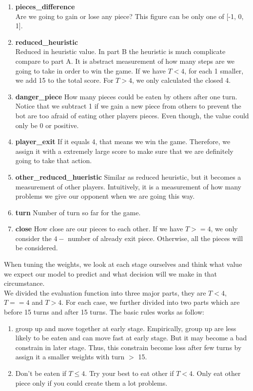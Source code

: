 \documentclass[11pt]{article}
\begin{document}
\begin{enumerate}
  \item \textbf{pieces\_difference} \\
        Are we going to gain or lose any piece? This figure can be only one of [-1, 0, 1].
  \item \textbf{reduced\_heuristic} \\
        Reduced in heuristic value. In part B the heuristic is much complicate compare to part A. It is
        abstract measurement of how many steps are we going to take in order to win the game. If we have 
        $T < 4$, for each 1 smaller, we add 15 to the total score. For $T > 4$, we only calculated the
        closed 4.
  \item \textbf{danger\_piece}
        How many pieces could be eaten by others after one turn. Notice that we subtract 1 if we gain a 
        new piece from others to prevent the bot are too afraid of eating other players pieces. 
        Even though, the value could only be 0 or positive.
  \item \textbf{player\_exit}
        If it equals 4, that means we win the game. Therefore, we assign it with a extremely large score to make sure
        that we are definitely going to take that action.
  \item \textbf{other\_reduced\_hueristic}
        Similar as reduced heuristic, but it becomes a measurement of other players. Intuitively, it is a measurement of
        how many problems we give our opponent when we are going this way.
  \item \textbf{turn}
        Number of turn so far for the game.
  \item \textbf{close}
        How close are our pieces to each other. If we have $T >= 4$, we only consider the $4 - $ number of 
        already exit piece. Otherwise, all the pieces will be considered.
\end{enumerate}

When tuning the weights, we look at each stage ourselves and think what value we expect our model 
to predict and what decision will we make in that circumstance.
\\
We divided the evaluation function into three major parts, they are $T<4$, $T==4$ and $T>4$. For each case, we further
divided into two parts which are before 15 turns and after 15 turns. The basic rules works as follow:

\begin{enumerate}
  \item group up and move together at early stage. Empirically, group up are less likely to be eaten and can move fast
        at early stage. But it may become a bad constrain in later stage. Thus, this constrain become loss 
        after few turns by assign it a smaller weights with turn $>$ 15.
  \item Don't be eaten if $T \leq 4$. Try your best to eat other if $T < 4$. Only eat other piece only if you could
        create them a lot problems.
\end{enumerate}
\end{document}
